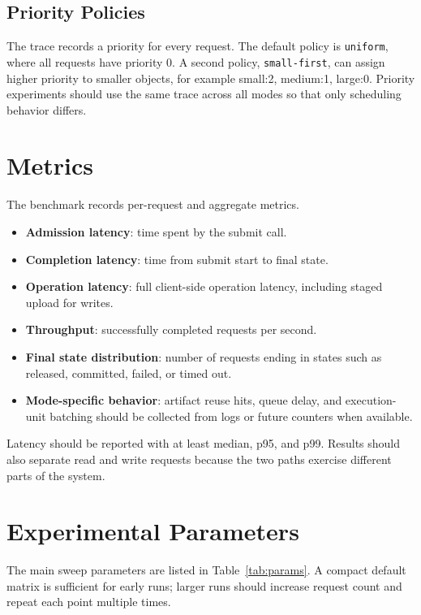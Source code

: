 \documentclass[11pt]{article}
\begin{document}
\subsection{Priority Policies}

The trace records a priority for every request.  The default policy is
\texttt{uniform}, where all requests have priority 0.  A second policy,
\texttt{small-first}, can assign higher priority to smaller objects, for
example small:2, medium:1, large:0.  Priority experiments should use the same
trace across all modes so that only scheduling behavior differs.

\section{Metrics}

The benchmark records per-request and aggregate metrics.

\begin{itemize}[leftmargin=*]
  \item \textbf{Admission latency}: time spent by the submit call.
  \item \textbf{Completion latency}: time from submit start to final state.
  \item \textbf{Operation latency}: full client-side operation latency,
  including staged upload for writes.
  \item \textbf{Throughput}: successfully completed requests per second.
  \item \textbf{Final state distribution}: number of requests ending in states
  such as released, committed, failed, or timed out.
  \item \textbf{Mode-specific behavior}: artifact reuse hits, queue delay, and
  execution-unit batching should be collected from logs or future counters when
  available.
\end{itemize}

Latency should be reported with at least median, p95, and p99.  Results should
also separate read and write requests because the two paths exercise different
parts of the system.

\section{Experimental Parameters}

The main sweep parameters are listed in Table~\ref{tab:params}.  A compact
default matrix is sufficient for early runs; larger runs should increase request
count and repeat each point multiple times.
\end{document}
